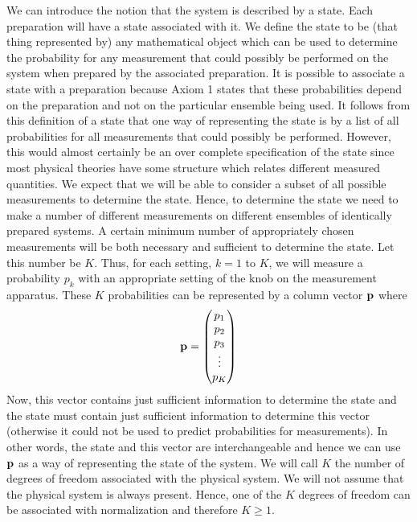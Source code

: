 \documentclass[12pt]{article}
\begin{document}
We can introduce the notion that the system is described by a state.
Each preparation will have a state associated with it. We
define the state to be (that thing represented by)
any mathematical object which can be used to
determine the probability for any measurement that could possibly be
performed on the system when prepared by the associated preparation. It
is possible to associate a state with a preparation because Axiom 1
states that these probabilities depend on the preparation and not on the
particular ensemble being used.  It follows from this definition of a
state that one way of representing the state is by a list of all
probabilities for all measurements that could possibly
be performed. However, this
would almost certainly be an over complete specification of the state
since most
physical theories have some structure which relates different measured
quantities. We expect that we will be able to consider a subset
of all possible measurements to determine the state.
Hence, to determine the state we need to make a number
of different measurements on
different ensembles of identically prepared systems.
A certain minimum number of appropriately chosen measurements will be
both necessary and sufficient to determine the state. Let this number be
$K$.  Thus, for each setting, $k=1$ to $K$, we will measure a
probability $p_k$ with an appropriate setting of the knob on the
measurement apparatus.
These $K$ probabilities can be represented by a column vector
${\bf p}$ where
\begin{equation}
  {\bf p} = \left(
  \begin{matrix} p_1 \\ p_2 \\ p_3 \\ \vdots \\ p_K \end{matrix} \right)
\end{equation}
Now, this vector contains just sufficient information to determine the state
and the state must contain just sufficient information to determine this
vector (otherwise it could not be used to predict probabilities for
measurements).  In other words, the state and this vector are
interchangeable and hence we can use ${\bf p}$ as a way of representing
the state of the system.
We will call $K$ the number of degrees of freedom associated with the
physical system.  We will not assume that the physical system is always
present.  Hence, one of the $K$ degrees of freedom can be associated
with normalization and therefore $K\geq 1$.
\end{document}
